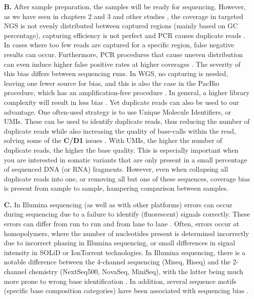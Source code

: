 \textbf{B.} After sample preparation, the samples will be ready for sequencing. 
However, as we have seen in chapters 2 and 3 and other studies \cite{Ross_2013}, the coverage in targeted NGS is not evenly distributed between captured regions (mainly based on GC percentage), capturing efficiency is not perfect and PCR causes duplicate reads \cite{Head_2014}. 
In cases where too few reads are captured for a specific region, false negative results can occur. 
Furthermore, PCR procedures that cause uneven distribution can even induce higher false positive rates at higher coverages \cite{Wall_2014}. 
The severity of this bias differs between sequencing runs. 
In WGS, no capturing is needed, leaving one fewer source for bias, and this is also the case in the PacBio procedure, which has an amplification-free procedure \cite{Quail_2012}. 
In general, a higher library complexity will result in less bias \cite{Head_2014}. 
Yet duplicate reads can also be used to our advantage. 
One often-used strategy  is to use Unique Molecule Identifiers, or UMIs. 
These can be used to identify duplicate reads, thus reducing the number of duplicate reads while also increasing the quality of base-calls within the read, solving some of the \textbf{C/D1} issues \cite{Smith_2017a}. 
With UMIs, the higher the number of duplicate reads, the higher the base quality. 
This is especially important when you are interested in somatic variants that are only present in a small percentage of sequenced DNA (or RNA) fragments. 
However, even when collapsing all duplicate reads into one, or removing all but one of these sequences, coverage bias is present from sample to sample, hampering comparison between samples.

\textbf{C.} In Illumina sequencing (as well as with other platforms) errors can occur during sequencing  due to a failure to identify (fluorescent) signals correctly. 
These errors can differ from run to run and from lane to lane \cite{Aird_2011}. 
Often, errors occur at homopolymers, where the number of nucleotides present is determined incorrectly due to incorrect phasing in Illumina sequencing, or small differences in signal intensity in SOLiD or IonTorrent technologies. 
In Illumina sequencing, there is a notable difference between the 4-channel sequencing (Miseq, Hiseq) and the 2-channel chemistry (NextSeq500, NovaSeq, MiniSeq), with the latter being much more prone to wrong base identification \cite{Andrews_2016}. 
In addition, several sequence motifs (specific base composition categories) have been associated with sequencing bias \cite{Ross_2013}. 


